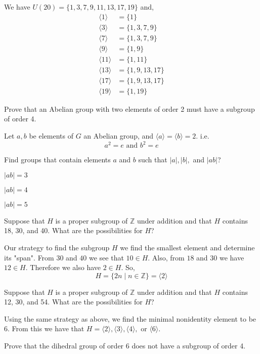\documentclass[11pt,largemargins]{homework}
\begin{document}
\quad We have $U(20)=\{1,3,7,9,11,13,17,19\}$ and,
\begin{align*}
    \langle 1\rangle &= \{1\}\\
    \langle 3\rangle &= \{1,3,7,9\}\\
    \langle 7\rangle &= \{1,3,7,9\}\\
    \langle 9\rangle &= \{1,9\}\\
    \langle 11\rangle &= \{1,11\}\\
    \langle 13\rangle &= \{1,9,13,17\}\\
    \langle 17\rangle &= \{1,9,13,17\}\\
    \langle 19\rangle &= \{1,19\}
\end{align*}

\question
Prove that an Abelian group with two elements of order 2 must have a subgroup of order 4.

\quad Let $a, b$ be elements of $G$ an Abelian group, and $\langle a\rangle=\langle b\rangle=2$. i.e.
$$a^2=e\text{ and }b^2=e$$

\question
Find groups that contain elements $a$ and $b$ such that $|a|, |b|,$ and $|ab|$?
\begin{alphaparts}
    \questionpart
    $|ab|=3$

    \questionpart
    $|ab|=4$

    \questionpart
    $|ab|=5$

\end{alphaparts}

\question
Suppose that $H$ is a proper subgroup of $\mathbb{Z}$ under addition and that $H$ contains 18, 30, and 40. 
What are the possibilities for $H$?

\quad Our strategy to find the subgroup $H$ we find the smallest element and determine its "span". From $30$ and $40$ we see that 
$10\in H$. Also, from $18$ and $30$ we have $12\in H$. Therefore we also have $2 \in H$. So,
$$H=\{2n\;|\; n\in\mathbb{Z}\} = \langle 2\rangle$$ 

\question
Suppose that $H$ is a proper subgroup of $\mathbb{Z}$ under addition and that $H$ contains 12, 30, and 54. 
What are the possibilities for $H$?

\quad Using the same strategy as above, we find the minimal nonidentity element to be $6$. From this we have that 
$H=\langle 2\rangle,\langle 3\rangle,\langle 4\rangle,\text{ or }\langle 6\rangle$.

\question
Prove that the dihedral group of order 6 does not have a subgroup of order 4.
\end{document}
